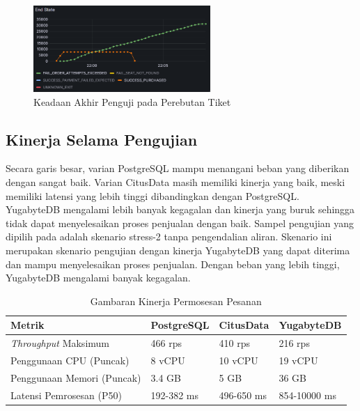 \begin{figure}[htbp]
    \centering
    \includegraphics[width=0.6\textwidth]{resources/chapter-4/pattern-sim-k6.png}
    \caption{Keadaan Akhir Penguji pada Perebutan Tiket}
    \label{fig:pattern-sim-k6}
\end{figure}


\subsection{Kinerja Selama Pengujian}

Secara garis besar, varian PostgreSQL mampu menangani beban yang diberikan dengan sangat baik. Varian CitusData masih memiliki kinerja yang baik, meski memiliki latensi yang lebih tinggi dibandingkan dengan PostgreSQL. YugabyteDB mengalami lebih banyak kegagalan dan kinerja yang buruk sehingga tidak dapat menyelesaikan proses penjualan dengan baik. Sampel pengujian yang dipilih pada adalah skenario stress-2 tanpa pengendalian aliran. Skenario ini merupakan skenario pengujian dengan kinerja YugabyteDB yang dapat diterima dan mampu menyelesaikan proses penjualan. Dengan beban yang lebih tinggi, YugabyteDB mengalami banyak kegagalan.

\begin{table}[h]
    \centering
    \caption{Gambaran Kinerja Permosesan Pesanan}
    \label{table:kinerja-pemrosesan-pesanan}
    \begin{tabular}{|l|l|l|l|}
        \hline
        \textbf{Metrik}              & \textbf{PostgreSQL} & \textbf{CitusData} & \textbf{YugabyteDB} \\
        \hline
        \textit{Throughput} Maksimum & 466 rps             & 410 rps            & 216 rps             \\
        \hline
        Penggunaan CPU (Puncak)      & 8 vCPU              & 10 vCPU            & 19 vCPU             \\
        \hline
        Penggunaan Memori (Puncak)   & 3.4 GB              & 5 GB               & 36 GB               \\
        \hline
        Latensi Pemrosesan (P50)     & 192-382 ms          & 496-650 ms         & 854-10000 ms        \\
        \hline
    \end{tabular}
\end{table}

